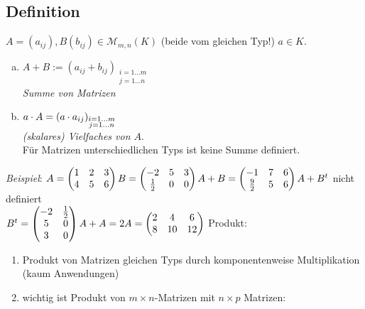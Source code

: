 \subsection{Definition}
$A = (a_{ij}), B (b_{ij}) \in \mathcal{M}_{m,n}(K)$ (beide vom gleichen Typ!) $a\in K$.
\begin{enumerate}[a)]
\item $A + B := (a_{ij} + b_{ij})_{\substack{i= 1\ldots m\\j=1\ldots n}}$\\
\emph{Summe von Matrizen}
\item $a\cdot A = (a\cdot a_{ij})_{\substack{i=1\ldots m\\j=1\ldots n}}$\\
\emph{(skalares) Vielfaches von $A$}.\\
Für Matrizen unterschiedlichen Typs ist keine Summe definiert.
\end{enumerate}
\emph{Beispiel}: $A = \begin{pmatrix}
1 & 2 & 3\\
4 & 5 & 6
\end{pmatrix} B = \begin{pmatrix}
-2 & 5 & 3\\
\frac{1}{2} & 0 & 0
\end{pmatrix}\\
A + B = \begin{pmatrix}
-1 & 7 & 6\\
\frac{9}{2} & 5 & 6
\end{pmatrix}\\
A+ B^t$ nicht definiert\\
$B^t = \begin{pmatrix}
-2 & \frac{1}{2}\\
5 & 0\\
3 & 0 
\end{pmatrix}\\
A + A = 2A = \begin{pmatrix}
2 & 4 & 6\\
8 & 10 & 12
\end{pmatrix}$
Produkt:\\
\begin{enumerate}[-]
\item Produkt von Matrizen gleichen Typs durch komponentenweise Multiplikation (kaum Anwendungen)
\item wichtig ist Produkt von $m \times n$-Matrizen mit $n \times p$ Matrizen:
\end{enumerate}
